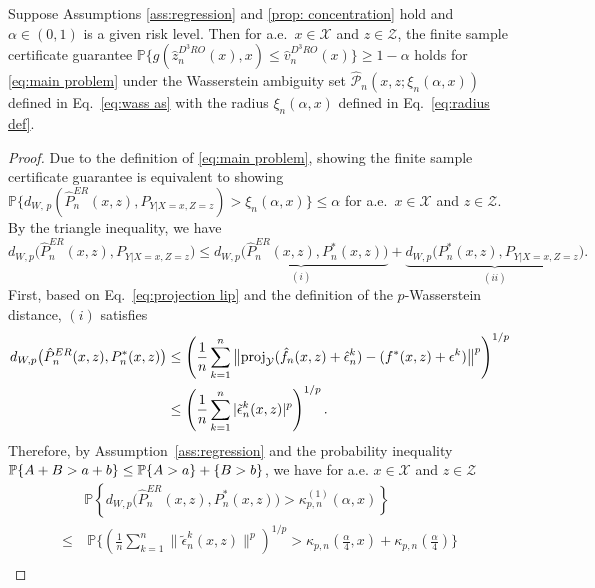 \documentclass[onefignum,onetabnum]{siamart251216}
\begin{document}
\begin{theorem}\label{thm:fsg}
Suppose Assumptions  \ref{ass:regression} and \ref{prop: concentration} hold and $\alpha \in (0,1)$ is a given risk level. Then for a.e.\ $x \in \mathcal{X}$ and $z \in \mathcal{Z}$, the finite sample certificate guarantee $\mathbb{P}\big\{g(\hat{z}_n^{D^3RO}(x),x) \leq \hat{v}_n^{D^3RO}(x)\big\} \geq 1-\alpha$ holds for \eqref{eq:main problem} under the Wasserstein ambiguity set $\hat{\mathcal{P}}_n(x,z;\xi_n(\alpha,x))$ defined in Eq.~\eqref{eq:wass as} with the radius $\xi_n(\alpha,x)$ defined in Eq.~\eqref{eq:radius def}.
\end{theorem}
\begin{proof}
Due to the definition of \eqref{eq:main problem}, showing the finite sample certificate guarantee is equivalent to showing $\mathbb{P} \big\{d_{W,\, p} (\hat{P}_n^{ER}(x,z),P_{Y|X=x,Z=z}) > \xi_n(\alpha,x)\big\} \leq \alpha$ for a.e.\ $x \in \mathcal{X}$ and $z \in \mathcal{Z}$. By the triangle inequality, we have
\allowdisplaybreaks
\small
\begin{equation*}
d_{W,p}\bigl(\hat P_n^{ER}(x,z),P_{Y|X=x,Z=z}\bigr)
\le \underbrace{d_{W,p}\bigl(\hat P_n^{ER}(x,z),P_n^*(x,z)\bigr)}_{(i)}
+ \underbrace{d_{W,p}\bigl(P_n^*(x,z),P_{Y|X=x,Z=z}\bigr)}_{(ii)}.
\end{equation*}
\normalsize
First, based on Eq.\ \eqref{eq:projection lip} and the definition of the $p$-Wasserstein distance, $(i)$ satisfies
\small
\begin{align*}
d_{W,p}\bigl(\hat P_n^{ER}(x,z),P_n^*(x,z)\bigr)
&\le \left(\frac{1}{n} \sum_{k=1}^n \big\|{\rm{proj}}_\mathcal{Y} (\hat{f}_n(x,z)+\hat{\epsilon}_n^k)-(f^*(x,z)+\epsilon^k)\big\|^p\right)^{1/p} \\
& \le \left(\frac{1}{n}\sum_{k=1}^n |\tilde\epsilon_n^k(x,z)|^p\right)^{1/p}. 
\end{align*}
\normalsize
Therefore, by Assumption\ \ref{ass:regression} and the probability inequality 
$\mathbb P\{A+B >a+b\} \le \mathbb P\{A>a\} + \mathbb\{B >b\}$, we have for a.e. $x \in \mathcal X$ and $ z \in \mathcal Z$
\footnotesize
    \begin{align*}
        & \mathbb P \left\{
d_{W,p}\bigl(\hat P_n^{ER}(x,z),P_n^*(x,z)\bigr)
>
\kappa_{p,n}^{(1)}(\alpha,x)
\right\}
    \\
        \le &\ \mathbb{P}\bigg\{\left(\frac{1}{n} \sum_{k=1}^n \|\tilde{\epsilon}_n^k(x,z)\|^p\right)^{1/p} > \kappa_{p,n} (\frac{\alpha}{4},x) + \kappa_{p,n} (\frac{\alpha}{4})\bigg\} 
    \\

\end{align*}
\end{proof}
\end{document}
